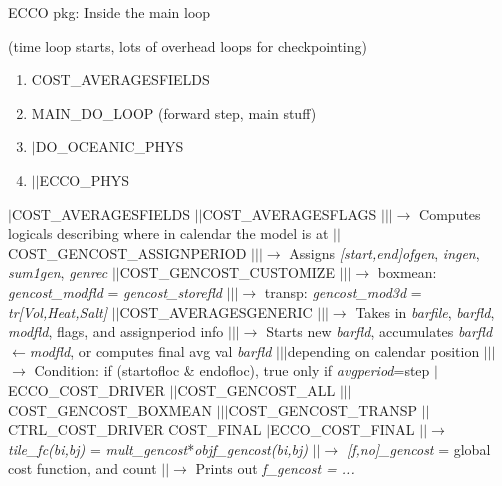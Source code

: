 \documentclass[a4paper,10pt]{article}
\newcommand{\ai}{$|$\hspace{\algorithmicindent}}
\begin{document}
  \begin{algorithm}
  \caption{ECCO pkg: Inside the main loop}
  \begin{algorithmic}
   \label{alg:ecco2}
   \STATE (time loop starts, lots of overhead loops for checkpointing)
      \STATE 
	\begin{enumerate}
           \item COST\_AVERAGESFIELDS
           \item MAIN\_DO\_LOOP (forward step, main stuff)
           \item\ai DO\_OCEANIC\_PHYS
           \item\ai\ai ECCO\_PHYS
        \end{enumerate}
   \ENDFOR
   \STATE\ai COST\_AVERAGESFIELDS
   \STATE\ai\ai COST\_AVERAGESFLAGS
   \STATE\ai\ai\ai $\rightarrow$ Computes logicals describing where in calendar the model is at
   \STATE\ai\ai COST\_GENCOST\_ASSIGNPERIOD
   \STATE\ai\ai\ai $\rightarrow$ Assigns \textit{[start,end]ofgen}, \textit{ingen}, \textit{sum1gen}, \textit{genrec}
   \STATE\ai\ai COST\_GENCOST\_CUSTOMIZE
   \STATE\ai\ai\ai $\rightarrow$ boxmean: \textit{gencost\_modfld} = \textit{gencost\_storefld}
   \STATE\ai\ai\ai $\rightarrow$ transp: \textit{gencost\_mod3d} = \textit{tr[Vol,Heat,Salt]}
   \STATE\ai\ai COST\_AVERAGESGENERIC
   \STATE\ai\ai\ai $\rightarrow$ Takes in \textit{barfile}, \textit{barfld}, \textit{modfld}, flags, and assignperiod info
   \STATE\ai\ai\ai $\rightarrow$ Starts new \textit{barfld}, accumulates \textit{barfld}$\leftarrow$\textit{modfld}, or computes final avg val \textit{barfld} 
   \STATE\ai\ai\ai depending on calendar position
   \STATE\ai\ai\ai $\rightarrow$ Condition: if (startofloc \& endofloc), true only if \textit{avgperiod}=step
   \STATE\ai ECCO\_COST\_DRIVER
   \STATE\ai\ai COST\_GENCOST\_ALL
   \STATE\ai\ai\ai COST\_GENCOST\_BOXMEAN
   \STATE\ai\ai\ai COST\_GENCOST\_TRANSP
   \STATE\ai\ai CTRL\_COST\_DRIVER
   \STATE COST\_FINAL
   \STATE\ai ECCO\_COST\_FINAL
   \STATE\ai\ai $\rightarrow$ \textit{tile\_fc(bi,bj)} = \textit{mult\_gencost}*\textit{objf\_gencost(bi,bj)}
   \STATE\ai\ai $\rightarrow$ \textit{[f,no]\_gencost} = global cost function, and count
   \STATE\ai\ai $\rightarrow$ Prints out \textit{f\_gencost = ...}
  \end{algorithmic}
\end{algorithm}
\end{document}
